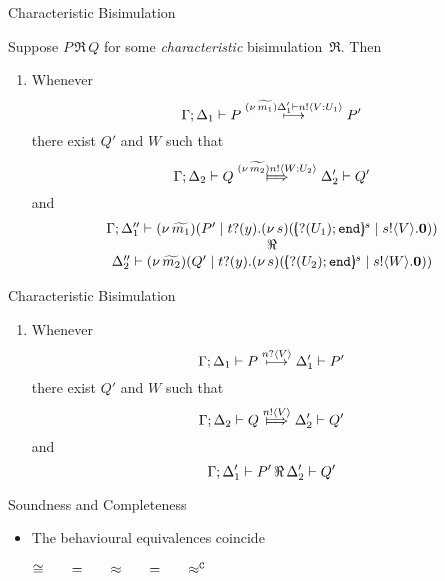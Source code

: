 \documentclass{beamer}
\begin{document}
	\begin{frame}{Characteristic Bisimulation}

		Suppose $P\, \Re\, Q$ for some {\em characteristic} bisimulation~$\Re$. Then
		\begin{enumerate}[$(\star)$]
			\item	Whenever
				\[
					\Gamma; \Delta_1 \vdash P \stackrel{(\nu\, \widetilde{m_1}) \Delta_1' \vdash n ! \langle V: U_1 \rangle}{\longmapsto} P'
				\]
				there exist $Q'$ and $W$ such that 
				\[
					\Gamma; \Delta_2 \proves Q \Hby{\news{\widetilde{m_2}} \bactout{n}{W: U_2}} \Delta_2' \proves Q'
				\]
				and
				\[
					\begin{array}{c}
						\Gamma; \Delta_1'' \proves \newsp{\widetilde{m_1}}{P' \Par \binp{t}{y}\newsp{s}{\mapchar{\btinp{U_1} \tinact}{s} \Par \bout{s}{V} \inact}}
						\\
						\Re
						\\
						\Delta_2'' \proves \newsp{\widetilde{m_2}}{Q' \Par \binp{t}{y}\newsp{s}{\mapchar{\btinp{U_2} \tinact}{s} \Par \bout{s}{W} \inact}}
					\end{array}
				\]
		\end{enumerate}
	\end{frame}

	\begin{frame}{Characteristic Bisimulation}
		\begin{enumerate}[$(\star)$]
			\item	Whenever
				\[
					\Gamma; \Delta_1 \vdash P \stackrel{n ? \langle V \rangle}{\longmapsto} \Delta_1' \vdash P'
				\]
				there exist $Q'$ and $W$ such that 
				\[
					\Gamma; \Delta_2 \proves Q \Hby{\bactout{n}{V}} \Delta_2' \proves Q'
				\]
				and
				\[
					\Gamma; \Delta_1' \vdash P'\, \Re\, \Delta_2' \vdash Q'
				\]
		\end{enumerate}
	\end{frame}

	\begin{frame}{Soundness and Completeness}
		\begin{itemize}
			\item	The behavioural equivalences coincide

				\begin{theorem}
					\begin{center}
					$\cong \qquad =\qquad \approx \qquad =\qquad \approx^\mathtt{C}$
					\end{center}
				\end{theorem}
		\end{itemize}
	\end{frame}
\end{document}
